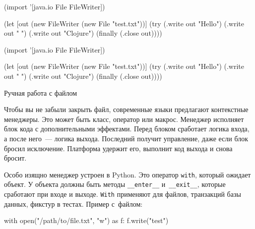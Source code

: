 \begin{listing}[ht!]

\ifx\devicetype\mobile

\begin{english}
  \begin{clojure}
(import '[java.io File FileWriter])

(let [out (new FileWriter
            (new File "test.txt"))]
  (try
    (.write out "Hello")
    (.write out " ")
    (.write out "Clojure")
    (finally
      (.close out))))
  \end{clojure}
\end{english}

\else

\begin{english}
  \begin{clojure}
(import '[java.io File FileWriter])

(let [out (new FileWriter (new File "test.txt"))]
  (try
    (.write out "Hello")
    (.write out " ")
    (.write out "Clojure")
    (finally
      (.close out))))
  \end{clojure}
\end{english}

\fi

\caption{Ручная работа с файлом}
\label{fig:write-file}

\end{listing}

Чтобы вы не забыли закрыть файл, современные языки предлагают контекстные
менеджеры. Это может быть класс, оператор или макрос. Менеджер исполняет блок
кода с дополнительными эффектами. Перед блоком сработает логика входа, а после
него~--- логика выхода. Последний получит управление, даже если блок бросил
исключение. Платформа удержит его, выполнит код выхода и снова бросит.


Особо изящно менеджер устроен в Python. Это оператор \verb|with|, который
ожидает объект. У объекта должны быть методы \verb|__enter__|
и~\verb|__exit__|, которые сработают при входе и выходе. \verb|With|
применяют для файлов, транзакций базы данных, фикстур в тестах. Пример с~файлом:


\begin{english}
  \begin{python}
with open("/path/to/file.txt", "w") as f:
    f.write("test")
  \end{python}
\end{english}

